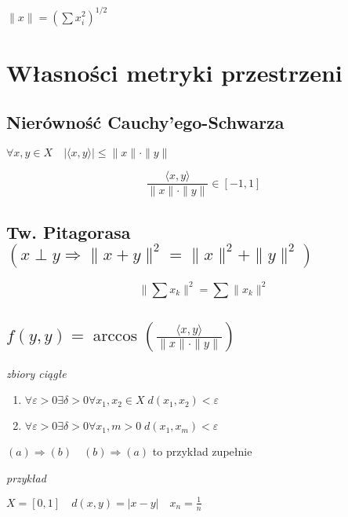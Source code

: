 \documentclass{article}
\begin{document}
$\|x\| = \left(\sum x_i^2\right)^{1/2}$

\section{Własności metryki przestrzeni}
\subsection{Nierówność Cauchy'ego-Schwarza}
$\forall x,y \in X \quad |\langle x,y \rangle| \leq \|x\| \cdot \|y\|$

$$\frac{\langle x,y \rangle}{\|x\| \cdot \|y\|} \in [-1,1]$$

\subsection{Tw. Pitagorasa $(x \perp y \Rightarrow \|x+y\|^2 = \|x\|^2 + \|y\|^2)$}
$$\|\sum x_k\|^2 = \sum \|x_k\|^2$$

\subsection{$f(y,y) = \arccos\left(\frac{\langle x,y \rangle}{\|x\| \cdot \|y\|}\right)$}

\vspace{0.3cm}
\textit{zbiory ciągłe}

\begin{enumerate}
\item $\forall \varepsilon > 0 \exists \delta > 0 \forall x_1, x_2 \in X \; d(x_1, x_2) < \varepsilon$
\item $\forall \varepsilon > 0 \exists \delta > 0 \forall x_1, m > 0 \; d(x_1, x_m) < \varepsilon$
\end{enumerate}

$(a) \Rightarrow (b) \quad (b) \Rightarrow (a)$ to przykład zupełnie

\vspace{0.3cm}
\textit{przykład}

$X = [0,1] \quad d(x,y) = |x-y| \quad x_n = \frac{1}{n}$
\end{document}
